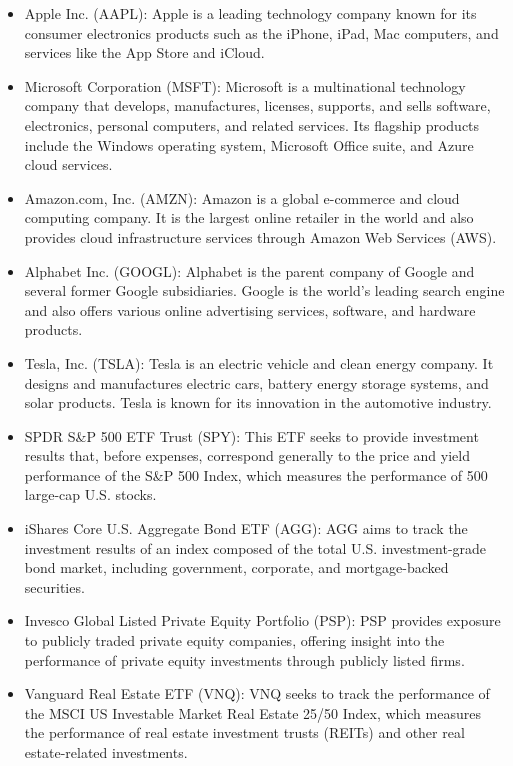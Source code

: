 \begin{itemize}
    \item Apple Inc. (AAPL): Apple is a leading technology company known for its consumer electronics products such as the iPhone, iPad, Mac computers, and services like the App Store and iCloud.
    \item Microsoft Corporation (MSFT): Microsoft is a multinational technology company that develops, manufactures, licenses, supports, and sells software, electronics, personal computers, and related services. Its flagship products include the Windows operating system, Microsoft Office suite, and Azure cloud services.
    \item Amazon.com, Inc. (AMZN): Amazon is a global e-commerce and cloud computing company. It is the largest online retailer in the world and also provides cloud infrastructure services through Amazon Web Services (AWS).
    \item Alphabet Inc. (GOOGL): Alphabet is the parent company of Google and several former Google subsidiaries. Google is the world’s leading search engine and also offers various online advertising services, software, and hardware products.
    \item Tesla, Inc. (TSLA): Tesla is an electric vehicle and clean energy company. It designs and manufactures electric cars, battery energy storage systems, and solar products. Tesla is known for its innovation in the automotive industry.
    \item SPDR S\&P 500 ETF Trust (SPY): This ETF seeks to provide investment results that, before expenses, correspond generally to the price and yield performance of the S\&P 500 Index, which measures the performance of 500 large-cap U.S. stocks.
    \item iShares Core U.S. Aggregate Bond ETF (AGG): AGG aims to track the investment results of an index composed of the total U.S. investment-grade bond market, including government, corporate, and mortgage-backed securities.
    \item Invesco Global Listed Private Equity Portfolio (PSP): PSP provides exposure to publicly traded private equity companies, offering insight into the performance of private equity investments through publicly listed firms.
    \item Vanguard Real Estate ETF (VNQ): VNQ seeks to track the performance of the MSCI US Investable Market Real Estate 25/50 Index, which measures the performance of real estate investment trusts (REITs) and other real estate-related investments.

\end{itemize}
